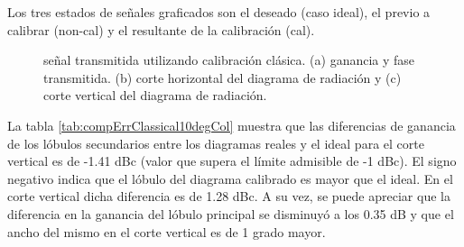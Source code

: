 Los tres estados de señales graficados son el deseado (caso ideal), el previo a calibrar (non-cal) y el resultante de la
calibración (cal).
\begin{figure}[H]
	\centering

	\caption{señal transmitida utilizando calibración clásica. (a) ganancia y fase transmitida. (b) corte horizontal del 
	diagrama de radiación y (c) corte vertical del diagrama de radiación.}
	\label{fig:compErrClassical10degCol}
\end{figure}
La tabla \ref{tab:compErrClassical10degCol} muestra que las diferencias de ganancia de los lóbulos secundarios entre los diagramas 
reales y el ideal para el corte vertical es de -1.41 dBc (valor que supera el límite admisible de -1 dBc). El signo negativo
indica que el lóbulo del diagrama calibrado es mayor que el ideal. En el corte vertical dicha diferencia es de 1.28 dBc. A su
vez, se puede apreciar que la diferencia en la ganancia del lóbulo principal se disminuyó a los 0.35 dB y que el ancho del mismo
en el corte vertical es de 1 grado mayor.

